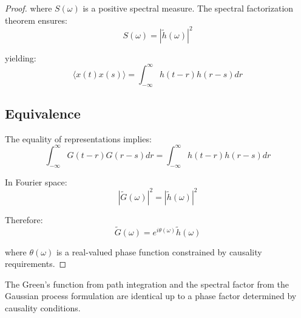 \documentclass{article}
\begin{document}
\begin{proof}
where $S(ω)$ is a positive spectral measure. The spectral factorization theorem ensures:
\begin{equation}
    S(ω) = |\tilde{h}(ω)|^2
\end{equation}

yielding:
\begin{equation}
    \langle x(t)x(s) \rangle = \int_{-\infty}^{\infty} h(t-r)h(r-s)dr
\end{equation}

\subsection{Equivalence}

The equality of representations implies:
\begin{equation}
    \int_{-\infty}^{\infty} G(t-r)G(r-s)dr = \int_{-\infty}^{\infty} h(t-r)h(r-s)dr
\end{equation}

In Fourier space:
\begin{equation}
    |\tilde{G}(ω)|^2 = |\tilde{h}(ω)|^2
\end{equation}

Therefore:
\begin{equation}
    \tilde{G}(ω) = e^{iθ(ω)}\tilde{h}(ω)
\end{equation}

where $θ(ω)$ is a real-valued phase function constrained by causality requirements.

\end{proof}

\begin{corollary}
The Green's function from path integration and the spectral factor from the Gaussian process formulation are identical up to a phase factor determined by causality conditions.
\end{corollary}
\end{document}
